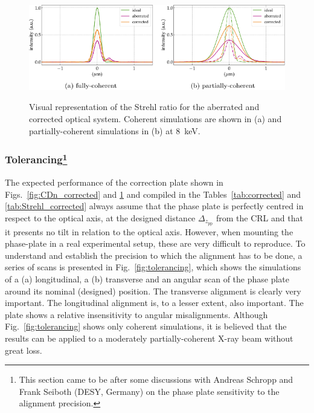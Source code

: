 \begin{refsection}
\begin{figure}[h]
        \centering
        {\includegraphics[width=0.7\linewidth]{figures/ch06/Strehl_correction.pdf}}
        \caption[Strehl ratio for the corrected system]{Visual representation of the Strehl ratio for the aberrated and corrected optical system. Coherent simulations are shown in (a) and partially-coherent simulations in (b) at 8~keV.}\label{fig:Strehl_correction}
\end{figure}

\subsubsection*{Tolerancing\footnote{This section came to be after some discussions with Andreas Schropp and Frank Seiboth (DESY, Germany) on the phase plate sensitivity to the alignment precision.}}

The expected performance of the correction plate shown in Figs.~\ref{fig:CDn_corrected} and \ref{fig:Strehl_correction} and compiled in the Tables~\ref{tab:corrected} and \ref{tab:Strehl_corrected} always assume that the phase plate is perfectly centred in respect to the optical axis, at the designed distance $\Delta_{z_\text{pp}}$ from the CRL and that it presents no tilt in relation to the optical axis. However, when mounting the phase-plate in a real experimental setup, these are very difficult to reproduce. To understand and establish the precision to which the alignment has to be done, a series of scans is presented in Fig.~\ref{fig:tolerancing}, which shows the simulations of a (a) longitudinal, a (b) transverse and an angular scan of the phase plate around its nominal (designed) position. The transverse alignment is clearly very important. The longitudinal alignment is, to a lesser extent, also important. The plate shows a relative insensitivity to angular misalignments. Although Fig.~\ref{fig:tolerancing} shows only coherent simulations, it is believed that the results can be applied to a moderately partially-coherent X-ray beam without great loss.


\end{refsection}
